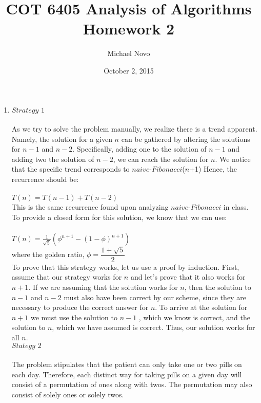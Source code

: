 \documentclass[]{report}
\title{COT 6405 Analysis of Algorithms \\ Homework 2}
\author{Michael Novo}
\date{October 2, 2015}
\begin{document}
\maketitle


\begin{enumerate}
	\item  
	
	$ \textit{Strategy 1} $ \\ \\
	As we try to solve the problem manually, we realize there is a trend apparent. Namely, the solution for a given $ \textit{n} $ can be gathered by altering the solutions for $ \textit{n} - 1 $ and $ \textit{n} - 2 $. Specifically, adding one to the solution of $ \textit{n} - 1 $ and adding two the solution of $ \textit{n} - 2 $, we can reach the solution for $ \textit{n} $. We notice that the specific trend corresponds to $ \textit{naive-Fibonacci}$($ \textit{n} $+1)  Hence, the recurrence should be: \\ \\
	 $ \textit{T}(\textit{n}) =  \textit{T}(\textit{n} - 1) + \textit{T}(\textit{n} - 2)$ \\ 
	 
	  This is the same recurrence found upon analyzing $ \textit{naive-Fibonacci}$ in class. To provide a closed form for this solution, we know  that we can use: \\ \\
	  
	$ T(\textit{n}) = \frac{1}{\sqrt{5}}(\phi^{n+1}-(1-\phi)^{n+1}) $ \\ 
	
	where the golden ratio, $ \phi = \dfrac{1 + \sqrt{5}}{2} $  \\
	
	To prove that this strategy works, let us use a proof by induction. First, assume that our strategy works for $ \textit{n} $ and let's prove that it also works for $ n + 1 $. If we are assuming that the solution works for $ n $, then the solution to $ n - 1 $  and $ n - 2 $  must also have been correct by our scheme, since they are necessary to produce the correct answer for $ \textit{n} $. To arrive at the solution for $ n + 1$  we must use the solution to $ n - 1 $ , which we know is correct, and the solution to $ n $, which we have assumed is correct. Thus, our solution works for all $ n $. \\
	
	
	$ \textit{Stategy 2} $ \\ \\
	The problem stipulates that the patient can only take one or two pills on each day. Therefore, each distinct way for taking pills on a given day will consist of a permutation of ones along with twos. The permutation may also consist of solely ones or solely twos.  
	

\end{enumerate}
\end{document}
